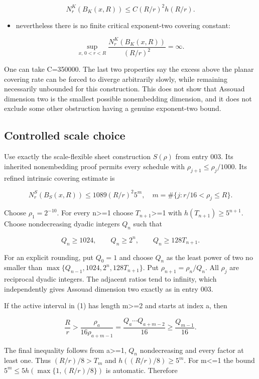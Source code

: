 \documentclass[
  11pt,
]{article}
\providecommand{\tightlist}{%
  \setlength{\itemsep}{0pt}\setlength{\parskip}{0pt}}
\theoremstyle{remark}\newtheorem{remark}[theorem]{Remark}
\begin{document}
\[
N_r^K(B_K(x,R))\le C(R/r)^2h(R/r).
\]

\begin{itemize}
\tightlist
\item
  nevertheless there is no finite critical exponent-two covering
  constant:
\end{itemize}

\[
\sup_{x,\,0<r<R}\frac{N_r^K(B_K(x,R))}{(R/r)^2}=\infty.
\]

One can take C=350000. The last two properties say the excess above the
planar covering rate can be forced to diverge arbitrarily slowly, while
remaining necessarily unbounded for this construction. This does not
show that Assouad dimension two is the smallest possible nonembedding
dimension, and it does not exclude some other obstruction having a
genuine exponent-two bound.

\subsection{Controlled scale choice}\label{controlled-scale-choice}

Use exactly the scale-flexible sheet construction \(S(\rho)\) from entry
003. Its inherited nonembedding proof permits every schedule with
\(\rho_{j+1}\le\rho_j/1000\). Its refined intrinsic covering estimate is

\[
N_r^S(B_S(x,R))\le1089(R/r)^2 5^m,\quad m=\#\{j:r/16<\rho_j\le R\}.\tag{1}
\]

Choose \(\rho_1=2^{-10}\). For every n\textgreater=1 choose
\(T_{n+1}\)\textgreater=1 with \(h(T_{n+1})\ge5^{n+1}\). Choose
nondecreasing dyadic integers \(Q_n\) such that

\[
Q_n\ge1024,\qquad Q_n\ge2^n,\qquad Q_n\ge128T_{n+1}.
\]

For an explicit rounding, put \(Q_0=1\) and choose \(Q_n\) as the least
power of two no smaller than \(\max\{Q_{n-1},1024,2^n,128T_{n+1}\}\).
Put \(\rho_{n+1}=\rho_n/Q_n\). All \(\rho_j\) are reciprocal dyadic
integers. The adjacent ratios tend to infinity, which independently
gives Assouad dimension two exactly as in entry 003.

If the active interval in (1) has length m\textgreater=2 and starts at
index a, then

\[
\frac Rr>\frac{\rho_a}{16\rho_{a+m-1}}=\frac{Q_a\cdots Q_{a+m-2}}{16}\ge\frac{Q_{m-1}}{16}.
\]

The final inequality follows from a\textgreater=1, \(Q_n\) nondecreasing
and every factor at least one. Thus \((R/r)/8>T_m\) and
\(h((R/r)/8)\ge5^m\). For m\textless=1 the bound
\(5^m\le5h(\max\{1,(R/r)/8\})\) is automatic. Therefore
\end{document}
